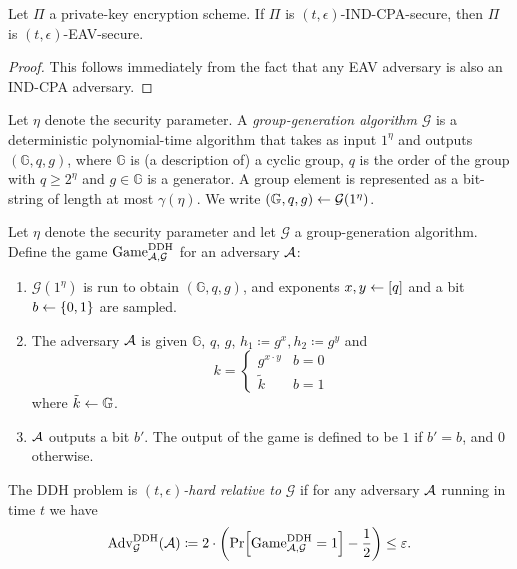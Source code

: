 \begin{lemma}
	Let $\Pi$ a private-key encryption scheme. If $\Pi$ is $(t, \epsilon)$-IND-CPA-secure, then $\Pi$ is $(t, \epsilon)$-EAV-secure.
\end{lemma}
\begin{proof}
	This follows immediately from the fact that any EAV adversary is also an IND-CPA adversary.
\end{proof}

\begin{definition}
	Let $\eta$ denote the security parameter. A \emph{group-generation algorithm} $\mathcal{G}$ is a deterministic polynomial-time algorithm that takes as input $1^\eta$ and outputs $(\mathbb{G}, q, g)$, where $\mathbb{G}$ is (a description of) a cyclic group, $q$ is the order of the group with $q \ge 2^\eta$  and $g \in \mathbb{G}$ is a generator. A group element is represented as a bit-string of length at most $\gamma(\eta)$. We write $(\mathbb{G}, q, g) \leftarrow \mathcal{G}(1^\eta)$.
\end{definition}

\begin{definition}
	Let $\eta$ denote the security parameter and let $\mathcal{G}$ a group-generation algorithm.
	Define the game $\mathrm{Game}_{\mathcal{A}, \mathcal{G}}^{\mathrm{DDH}}$ for an adversary $\mathcal{A}$:
	\begin{enumerate}[1.]
		\item $\mathcal{G}(1^\eta)$ is run to obtain $(\mathbb{G}, q, g)$, and exponents $x, y \leftarrow [q]$ and a bit $b \leftarrow \{0, 1\}$ are sampled.
		\item The adversary $\mathcal{A}$ is given $\mathbb{G}$, $q$, $g$, $h_1 \coloneqq g^x, h_2 \coloneqq g^y$ and
		      \[
			      k = \begin{cases}
				      g^{x \cdot y} & b = 0 \\
				      \tilde{k}     & b = 1
			      \end{cases}
		      \]
		      where $\tilde{k} \leftarrow \mathbb{G}$.
		\item $\mathcal{A}$ outputs a bit $b'$. The output of the game is defined to be $1$ if $b' = b$, and $0$ otherwise.
	\end{enumerate}
\end{definition}

\begin{definition}
	The DDH problem is \emph{$(t, \epsilon)$-hard relative to} $\mathcal{G}$ if for any adversary $\mathcal{A}$ running in time $t$ we have
	\begin{align*}
		\mathrm{Adv}_{\mathcal{G}}^{\mathrm{DDH}}(\adv) \coloneqq 2 \cdot \left(\pr{\mathrm{Game}_{\adv, \mathcal{G}}^{\mathrm{DDH}} = 1} - \frac{1}{2}\right) \le \epsilon.
	\end{align*}
\end{definition}

